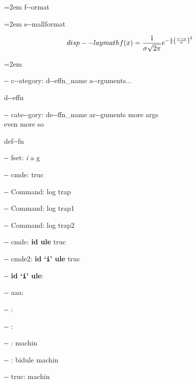\documentclass{book}
\begin{document}
\par\begingroup\obeylines\obeyspaces\frenchspacing\leftskip=2em\relax\parskip=0pt\relax{}%
f{-}{-}ormat
\endgroup{}%

\par\begingroup\obeylines\obeyspaces\frenchspacing\leftskip=2em\relax\parskip=0pt\relax\footnotesize{}%
s{-}{-}mallformat
\endgroup{}%

\endgroup{}%
$$
disp--laymath
f(x) = {1 \over \sigma \sqrt{2\pi}}e^{-{1 \over 2}\left({x-\mu \over \sigma}\right)^2}
$$
\par\begingroup\obeylines\obeyspaces\frenchspacing\leftskip=2em\relax\parskip=0pt\relax\ttfamily{}%

\hbox{}{-}{-} c{-}{-}ategory: d{-}{-}effn\_name a{-}{-}rguments...


%
d{-}{-}effn

\hbox{}{-}{-} cate{-}{-}gory: de{-}{-}ffn\_name ar{-}{-}guments    more args \leavevmode{}\\ even more so


%
def{-}{-}fn

\hbox{}{-}{-} fset: \emph{i} a g


%
%
\hbox{}{-}{-} cmde: truc 


%
\hbox{}{-}{-} Command: log trap 


%
\hbox{}{-}{-} Command: log trap1 


%
\hbox{}{-}{-} Command: log trap2 


%
\hbox{}{-}{-} cmde: \textbf{id ule} truc


%
\hbox{}{-}{-} cmde2: \textbf{id `\texttt{i}' ule} truc


%
\hbox{}{-}{-} \textbf{id `\texttt{i}' ule}: 



\hbox{}{-}{-} aaa: 


\hbox{}{-}{-} : 


\hbox{}{-}{-} : 


\hbox{}{-}{-} : machin


%
\hbox{}{-}{-} : bidule machin


%
\hbox{}{-}{-} truc: machin
\end{document}
